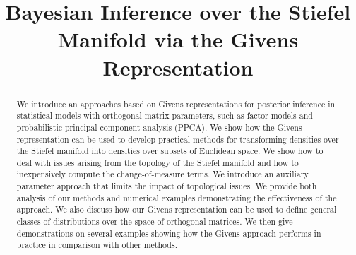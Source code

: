 \documentclass[ba]{imsart}
\numberwithin{equation}{section}
\theoremstyle{plain}
\begin{document}
\begin{frontmatter}
\title{Bayesian Inference over the Stiefel Manifold via the Givens Representation}


\begin{abstract}
We introduce an approaches based on Givens representations for posterior inference in statistical models with orthogonal matrix parameters, such as factor models and probabilistic principal component analysis (PPCA).  We show how the Givens representation can be used to develop practical methods for transforming densities over the Stiefel manifold into densities over subsets of Euclidean space.  We show how to deal with issues arising from the topology of the Stiefel manifold and how to inexpensively compute the change-of-measure terms.  We introduce an auxiliary parameter approach that limits the impact of topological issues.  We provide both analysis of our methods and numerical examples demonstrating the effectiveness of the approach.  We also discuss how our Givens representation can be used to define general classes of distributions over the space of orthogonal matrices.  We then give demonstrations on several examples showing how the Givens approach performs in practice in comparison with other methods.  
\end{abstract}

\begin{keyword}[class=MSC]
\end{keyword}

\begin{keyword}
\kwd{\LaTeXe}
\end{keyword}

\end{frontmatter}
\end{document}
